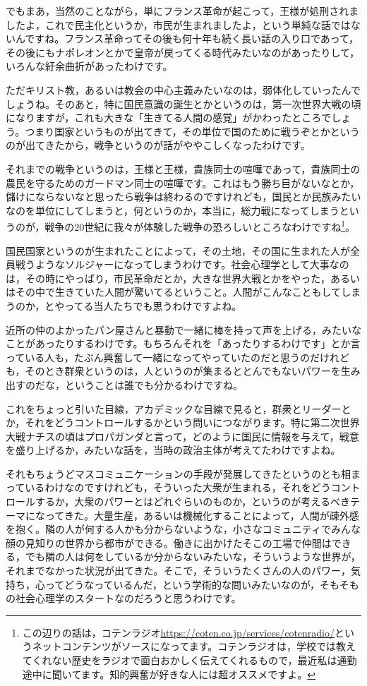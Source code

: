 \documentclass{ltjsbook}
\begin{document}
でもまあ，当然のことながら，単にフランス革命が起こって，王様が処刑されましたよ，これで民主化というか，市民が生まれましたよ，という単純な話ではないんですね。フランス革命ってその後も何十年も続く長い話の入り口であって，その後にもナポレオンとかで皇帝が戻ってくる時代みたいなのがあったりして，いろんな紆余曲折があったわけです。

ただキリスト教，あるいは教会の中心主義みたいなのは，弱体化していったんでしょうね。そのあと，特に国民意識の誕生とかというのは，第一次世界大戦の頃になりますが，これも大きな「生きてる人間の感覚」がかわったところでしょう。つまり国家というものが出てきて，その単位で国のために戦うぞとかというのが出てきたから，戦争というのが話がややこしくなったわけです。

それまでの戦争というのは，王様と王様，貴族同士の喧嘩であって，貴族同士の農民を守るためのガードマン同士の喧嘩です。これはもう勝ち目がないなとか，儲けにならないなと思ったら戦争は終わるのですけれども，国民とか民族みたいなのを単位にしてしまうと，何というのか，本当に，総力戦になってしまうというのが，戦争の20世紀に我々が体験した戦争の恐ろしいところなわけですね\footnote{この辺りの話は，コテンラジオ\url{https://coten.co.jp/services/cotenradio/}というネットコンテンツがソースになってます。コテンラジオは，学校では教えてくれない歴史をラジオで面白おかしく伝えてくれるもので，最近私は通勤途中に聞いてます。知的興奮が好きな人には超オススメですよ。}。

国民国家というのが生まれたことによって，その土地，その国に生まれた人が全員戦うようなソルジャーになってしまうわけです。社会心理学として大事なのは，その時にやっぱり，市民革命だとか，大きな世界大戦とかをやった，あるいはその中で生きていた人間が驚いてるということ。人間がこんなこともしてしまうのか，とやってる当人たちでも思うわけですよね。

近所の仲のよかったパン屋さんと暴動で一緒に棒を持って声を上げる，みたいなことがあったりするわけです。もちろんそれを「あったりするわけです」とか言っている人も，たぶん興奮して一緒になってやっていたのだと思うのだけれども，そのとき群衆というのは，人というのが集まるととんでもないパワーを生み出すのだな，ということは誰でも分かるわけですね。

これをちょっと引いた目線，アカデミックな目線で見ると，群衆とリーダーとか，それをどうコントロールするかという問いにつながります。特に第二次世界大戦ナチスの頃はプロパガンダと言って，どのように国民に情報を与えて，戦意を盛り上げるか，みたいな話を，当時の政治主体が考えてたわけですよね。

それもちょうどマスコミュニケーションの手段が発展してきたというのとも相まっているわけなのですけれども，そういった大衆が生まれる，それをどうコントロールするか，大衆のパワーとはどれぐらいのものか，というのが考えるべきテーマになってきた。大量生産，あるいは機械化することによって，人間が疎外感を抱く。隣の人が何する人かも分からないような，小さなコミュニティでみんな顔の見知りの世界から都市ができる。働きに出かけたそこの工場で仲間はできる，でも隣の人は何をしているか分からないみたいな，そういうような世界が，それまでなかった状況が出てきた。そこで，そういうたくさんの人のパワー，気持ち，心ってどうなっているんだ，という学術的な問いみたいなのが，そもそもの社会心理学のスタートなのだろうと思うわけです。
\end{document}
